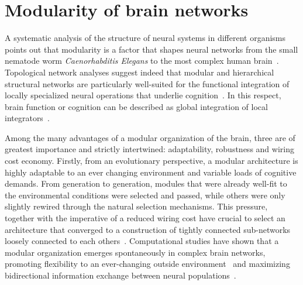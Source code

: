 \section{Modularity of brain networks}
A systematic analysis of the structure of neural systems in different organisms points out that modularity is a factor that shapes neural networks from the small nematode worm \emph{Caenorhabditis Elegans} to the most complex human brain~\cite{meunier2010,towlson2013,park2013}. 
Topological network analyses suggest indeed that modular and hierarchical structural networks are particularly well-suited for the functional integration of locally specialized neural operations that underlie cognition~\cite{sporns2004,sporns2004a,bullmore2012,meunier2010,bressler2010}.
In this respect, brain function or cognition can be described as global integration of local integrators~\cite{park2013}.

Among the many advantages of a modular organization of the brain, three are of greatest importance and strictly intertwined: adaptability, robustness and wiring cost economy.
Firstly, from an evolutionary perspective, a modular architecture is highly adaptable to an ever changing environment and variable loads of cognitive demands.
From generation to generation, modules that were already well-fit to the environmental conditions were selected and passed, while others were only slightly rewired through the natural selection mechanisms. This pressure, together with the imperative of a reduced wiring cost have crucial to select an architecture that converged to a construction of tightly connected sub-networks loosely connected to each others~\cite{clune2013}.
Computational studies have shown that a modular organization emerges spontaneously in complex brain networks, promoting flexibility to an ever-changing outside environment~\cite{kashtan2005,kashtan2007} and maximizing bidirectional information exchange between neural populations~\cite{yamaguti2015}.

